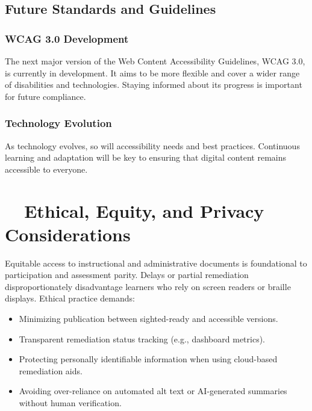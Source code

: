 \subsection{Future Standards and Guidelines}\label{ch15:ssec:future-standards}

\subsubsection{WCAG 3.0 Development}\label{ch15:sssec:wcag3}
The next major version of the Web Content Accessibility Guidelines, WCAG 3.0, is currently in development. It aims to be more flexible and cover a wider range of disabilities and technologies. Staying informed about its progress is important for future compliance.

\subsubsection{Technology Evolution}\label{ch15:sssec:tech-evolution}
As technology evolves, so will accessibility needs and best practices. Continuous learning and adaptation will be key to ensuring that digital content remains accessible to everyone.

\section{~~Ethical, Equity, and Privacy Considerations}\label{ch15:sec:ethics-equity}
Equitable access to instructional and administrative documents is foundational to participation and assessment parity. Delays or partial remediation disproportionately disadvantage learners who rely on screen readers or braille displays. Ethical practice demands:
\begin{itemize}
	\item Minimizing publication  between sighted-ready and accessible versions.
	\item Transparent remediation status tracking (e.g., dashboard metrics).
	\item Protecting personally identifiable information when using cloud-based remediation aids.
	\item Avoiding over-reliance on automated alt text or AI-generated summaries without human verification.
\end{itemize}

